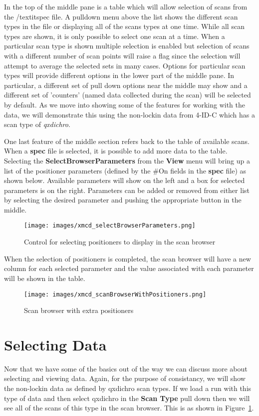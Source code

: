 \documentclass[12pt,letterpaper, openany]{book}
\begin{document}
In the top of the middle pane is a table which will allow selection of scans
from the /textit{spec} file.  A pulldown menu above the list shows the different
scan types in the file or displaying all of the scans types at one time.  While
all scan types are shown, it is only possible to select one scan at a time. 
When a particular scan type is shown multiple selection is enabled but selection
of scans with a different number of scan points will raise a flag since the
selection will attempt to average the selected sets in many cases.  Options for
particular scan types will provide different options in the lower part of the
middle pane.  In particular, a different set of pull down options near the
middle may show and a different set of 'counters' (named data collected during
the scan) will be selected by default.  As we move into showing some of the
features for working with the data, we will demonstrate this using the
non-lockin data from 4-ID-C which has a scan type of \textit{qxdichro}.

One last feature of the middle section refers back to the table of available
scans.  When a \textbf{spec} file is selected, it is possible to add more data
to the table.  Selecting the \textbf{SelectBrowserParameters} from the
\textbf{View} menu will bring up a list of the positioner parameters (defined
by the \#On fields in the \textbf{spec} file)  as shown below.  Available
parameters will show on the left and a box for selected parameters is on the
right.  Parameters can be added or removed from either list by selecting the
desired parameter and pushing the appropriate button in the middle.

\begin{figure}
\texttt{[image: images/xmcd\_selectBrowserParameters.png]}
\caption {Control for selecting positioners to display in the scan browser}
\end{figure}

When the selection of positioners is completed, the scan browser will have a new
column for each selected parameter and the value associated with each parameter
will be shown in the table.

\begin{figure}
\texttt{[image: images/xmcd\_scanBrowserWithPositioners.png]}
\caption {Scan browser with extra positioners}
\label{fig:selectedScanBrowser}
\end{figure}

\section{Selecting Data}\label{sec:selectingData}
Now that we have some of the basics out of the way we can discuss more about
selecting and viewing data.  Again, for the purpose of consistancy, we will show
the non-lockin data as defined by qxdichro scan types.  If we load a run with
this type of data and then select qxdichro in the \textbf{Scan Type} pull down
then we will see all of the scans of this type in the scan browser.  This is as
shown in Figure~\ref{fig:selectedScanBrowser}.  
\end{document}
